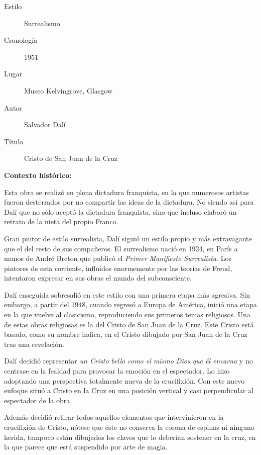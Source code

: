
\begin{description}
\item[Estilo] Surrealismo
\item[Cronología] 1951
\item[Lugar] Museo Kelvingrove, Glasgow
\item[Autor] Salvador Dalí
\item[Título] Cristo de San Juan de la Cruz
\end{description}

\textbf{Contexto histórico:}

Esta obra se realizó en plena dictadura franquista, en la que numerosos artistas fueron desterrados por no compartir las ideas de la dictadura. No siendo así para Dalí que no sólo aceptó la dictadura franquista, sino que incluso elaboró un retrato de la nieta del propio Franco.

Gran pintor de estilo surrealista, Dalí siguió un estilo propio y más extravagante que el del resto de sus compañeros. El surrealismo nació en 1924, en París a manos de André Breton que publicó el \textit{Primer Manifiesto Surrealista}. Los pintores de esta corriente, influidos enormemente por las teorías de Freud, intentaron expresar en sus obras el mundo del subconsciente.

Dalí enseguida sobresalió en este estilo con una primera etapa más agresiva. Sin embargo, a partir del 1948, cuando regresó a Europa de América, inició una etapa en la que vuelve al clasicismo, reproduciendo sus primeros temas religiosos. Una de estas obras religiosas es la del Cristo de San Juan de la Cruz. Este Cristo está basado, como su nombre indica, en el Cristo dibujado por San Juan de la Cruz tras una revelación.

Dalí decidió representar \textit{un Cristo bello como el mismo Dios que él encarna} y no centrase en la fealdad para provocar la emoción en el espectador. Lo hizo adoptando una perspectiva totalmente nueva de la crucifixión. Con este nuevo enfoque situó a Cristo en la Cruz en una posición vertical y casi perpendicular al espectador de la obra.

Además decidió retirar todos aquellos elementos que intervinieron en la crucifixión de Cristo, nótese que éste no conserva la corona de espinas ni ninguna herida, tampoco están dibujados los clavos que lo deberían sostener en la cruz, en la que parece que está suspendido por arte de magia.

